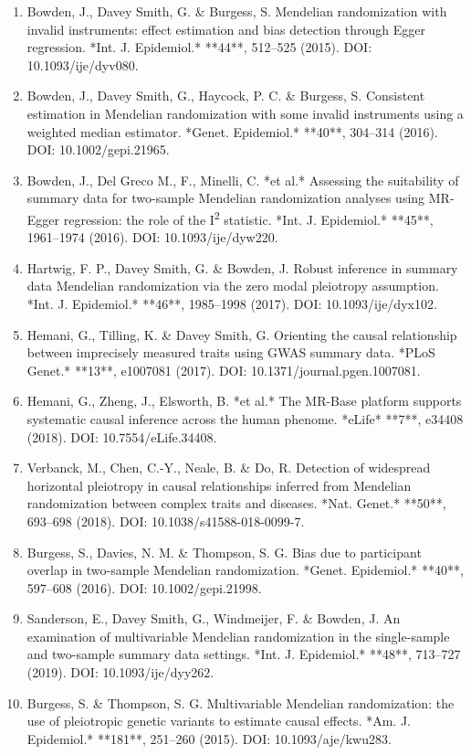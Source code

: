 \documentclass[11pt]{article}
\begin{document}
\begin{enumerate}
\item Bowden, J., Davey Smith, G. \& Burgess, S. Mendelian randomization with invalid instruments: effect estimation and bias detection through Egger regression. *Int. J. Epidemiol.* **44**, 512--525 (2015). DOI: 10.1093/ije/dyv080.
\item Bowden, J., Davey Smith, G., Haycock, P. C. \& Burgess, S. Consistent estimation in Mendelian randomization with some invalid instruments using a weighted median estimator. *Genet. Epidemiol.* **40**, 304--314 (2016). DOI: 10.1002/gepi.21965.
\item Bowden, J., Del Greco M., F., Minelli, C. *et al.* Assessing the suitability of summary data for two-sample Mendelian randomization analyses using MR-Egger regression: the role of the I\textsuperscript{2} statistic. *Int. J. Epidemiol.* **45**, 1961--1974 (2016). DOI: 10.1093/ije/dyw220.
\item Hartwig, F. P., Davey Smith, G. \& Bowden, J. Robust inference in summary data Mendelian randomization via the zero modal pleiotropy assumption. *Int. J. Epidemiol.* **46**, 1985--1998 (2017). DOI: 10.1093/ije/dyx102.
\item Hemani, G., Tilling, K. \& Davey Smith, G. Orienting the causal relationship between imprecisely measured traits using GWAS summary data. *PLoS Genet.* **13**, e1007081 (2017). DOI: 10.1371/journal.pgen.1007081.
\item Hemani, G., Zheng, J., Elsworth, B. *et al.* The MR-Base platform supports systematic causal inference across the human phenome. *eLife* **7**, e34408 (2018). DOI: 10.7554/eLife.34408.
\item Verbanck, M., Chen, C.-Y., Neale, B. \& Do, R. Detection of widespread horizontal pleiotropy in causal relationships inferred from Mendelian randomization between complex traits and diseases. *Nat. Genet.* **50**, 693--698 (2018). DOI: 10.1038/s41588-018-0099-7.
\item Burgess, S., Davies, N. M. \& Thompson, S. G. Bias due to participant overlap in two-sample Mendelian randomization. *Genet. Epidemiol.* **40**, 597--608 (2016). DOI: 10.1002/gepi.21998.
\item Sanderson, E., Davey Smith, G., Windmeijer, F. \& Bowden, J. An examination of multivariable Mendelian randomization in the single-sample and two-sample summary data settings. *Int. J. Epidemiol.* **48**, 713--727 (2019). DOI: 10.1093/ije/dyy262.
\item Burgess, S. \& Thompson, S. G. Multivariable Mendelian randomization: the use of pleiotropic genetic variants to estimate causal effects. *Am. J. Epidemiol.* **181**, 251--260 (2015). DOI: 10.1093/aje/kwu283.

\end{enumerate}
\end{document}

